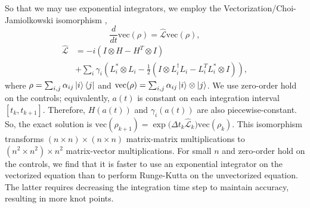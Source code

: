 So that we may use exponential integrators, we employ
the Vectorization/Choi-Jamiolkowski isomorphism \cite{Landi2018},
\begin{equation}
  \frac{d}{dt} \textrm{vec}({\rho}) = \hat{\mathcal{L}} \textrm{vec}({\rho}),
\end{equation}
\begin{equation}
  \begin{aligned}
    \hat{\mathcal{L}} &= -i(I \otimes H - H^{T} \otimes I)\\
    &+ \sum_{i} \gamma_{i}
    (L_{i}^{*} \otimes L_{i} - \frac{1}{2} (I \otimes L_{i}^{\dagger}L_{i}
    - L_{i}^{T}L_{i}^{*} \otimes I)),
  \end{aligned}
\end{equation}
where $\rho = \sum_{i, j} \alpha_{ij} \ket{i}\bra{j}$
and $\textrm{vec}(\rho) = \sum_{i, j} \alpha_{ij} \ket{i} \otimes \ket{j}$.
We use zero-order hold on the controls; equivalently, $a(t)$ is constant
on each integration interval $[t_{k}, t_{k + 1}]$. Therefore,
$H(a(t))$ and $\gamma_{i}(a(t))$ are also piecewise-constant.
So, the exact solution is
$\textrm{vec}(\rho_{k + 1}) = {\exp}{\textstyle(}\Delta t_{k}
\hat{\mathcal{L}}_{k}{\textstyle)} \textrm{vec}(\rho_{k})$.
This isomorphism transforms $(n \times n) \times (n \times n)$
matrix-matrix multiplications to $(n^{2} \times n^{2}) \times n^{2}$ matrix-vector
multiplications. For small $n$ and zero-order hold on the controls, we find that it is
faster to use an exponential integrator on the vectorized equation than to perform
Runge-Kutta on the unvectorized equation. The latter requires decreasing the integration
time step to maintain accuracy, resulting in more knot points.
